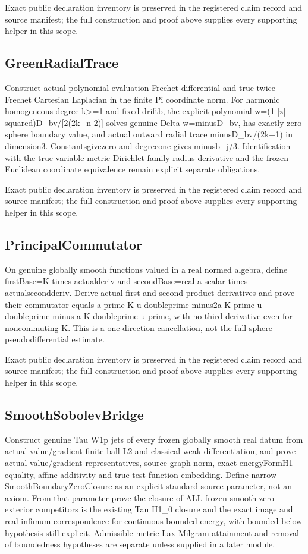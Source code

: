\documentclass[11pt]{article}
\theoremstyle{definition}
\theoremstyle{remark}
\numberwithin{equation}{section}
\begin{document}
Exact public declaration inventory is preserved in the registered claim record and source manifest; the full construction and proof above supplies every supporting helper in this scope.

\subsection{GreenRadialTrace}
\label{daytime-v010:greenradialtrace}
Construct actual polynomial evaluation Frechet differential and true twice-Frechet Cartesian Laplacian in the finite Pi coordinate norm. For harmonic homogeneous degree k>=1 and fixed driftb, the explicit polynomial w=(1-|z| squared)D\_bv/[2(2k+n-2)] solves genuine Delta w=minusD\_bv, has exactly zero sphere boundary value, and actual outward radial trace minusD\_bv/(2k+1) in dimension3. Constantsgivezero and degreeone gives minusb\_j/3. Identification with the true variable-metric Dirichlet-family radius derivative and the frozen Euclidean coordinate equivalence remain explicit separate obligations.

Exact public declaration inventory is preserved in the registered claim record and source manifest; the full construction and proof above supplies every supporting helper in this scope.

\subsection{PrincipalCommutator}
\label{daytime-v010:principalcommutator}
On genuine globally smooth functions valued in a real normed algebra, define firstBase=K times actualderiv and secondBase=real a scalar times actualsecondderiv. Derive actual first and second product derivatives and prove their commutator equals a-prime K u-doubleprime minus2a K-prime u-doubleprime minus a K-doubleprime u-prime, with no third derivative even for noncommuting K. This is a one-direction cancellation, not the full sphere pseudodifferential estimate.

Exact public declaration inventory is preserved in the registered claim record and source manifest; the full construction and proof above supplies every supporting helper in this scope.

\subsection{SmoothSobolevBridge}
\label{daytime-v010:smoothsobolevbridge}
Construct genuine Tau W1p jets of every frozen globally smooth real datum from actual value/gradient finite-ball L2 and classical weak differentiation, and prove actual value/gradient representatives, source graph norm, exact energyFormH1 equality, affine additivity and true test-function embedding. Define narrow SmoothBoundaryZeroClosure as an explicit standard source parameter, not an axiom. From that parameter prove the closure of ALL frozen smooth zero-exterior competitors is the existing Tau H1\_0 closure and the exact image and real infimum correspondence for continuous bounded energy, with bounded-below hypothesis still explicit. Admissible-metric Lax-Milgram attainment and removal of boundedness hypotheses are separate unless supplied in a later module.
\end{document}
